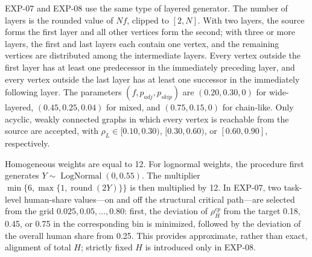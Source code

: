 EXP-07 and EXP-08 use the same type of layered generator. The number of layers
is the rounded value of $Nf$, clipped to $[2,N]$. With two layers, the source
forms the first layer and all other vertices form the second; with three or
more layers, the first and last layers each contain one vertex, and the
remaining vertices are distributed among the intermediate layers.
Every vertex outside the first layer has at least one predecessor in the
immediately preceding layer, and every vertex outside the last layer has at
least one successor in the immediately following layer. The parameters
$(f,p_{adj},p_{skip})$ are $(0.20,0.30,0)$ for wide-layered,
$(0.45,0.25,0.04)$ for mixed, and $(0.75,0.15,0)$ for chain-like. Only acyclic,
weakly connected graphs in which every vertex is reachable from the source are
accepted, with $\rho_L\in[0.10,0.30)$, $[0.30,0.60)$, or $[0.60,0.90]$,
respectively.

Homogeneous weights are equal to 12. For lognormal weights, the procedure first
generates $Y\sim\operatorname{LogNormal}(0,0.55)$. The multiplier
$\min\{6,\max\{1,\operatorname{round}(2Y)\}\}$ is then multiplied by 12. In
EXP-07, two task-level human-share values---on and off the structural critical
path---are selected from the grid $0.025,0.05,\ldots,0.80$: first, the deviation
of $\rho_H^{cp}$ from the target 0.18, 0.45, or 0.75 in the corresponding bin is
minimized, followed by the deviation of the overall human share from 0.25. This
provides approximate, rather than exact, alignment of total $H$; strictly fixed
$H$ is introduced only in EXP-08.
